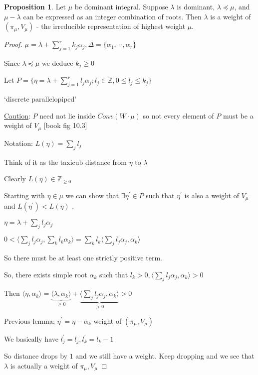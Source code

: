 \documentclass{article}
\theoremstyle{definition}
\newtheorem{proposition}{Proposition}
\begin{document}
\begin{proposition}
    Let \(\mu\) be dominant integral. Suppose \(\lambda\) is dominant, \(\lambda \preceq \mu\), and \(\mu - \lambda\)  can be expressed as an integer combination of roots. Then \(\lambda\) is a weight of \((\pi_\mu, V_\mu)\) - the irreducible representation of highest weight \(\mu\).     
\end{proposition}

\begin{proof}
    \(\mu = \lambda + \sum_{j=1}^r k_j \alpha_j, \Delta = \{ \alpha_1,\cdots, \alpha_r \} \)
    
    Since \(\lambda \preceq \mu\) we deduce \(k_j\geq 0\) 
    
    Let \(P = \{ \eta = \lambda + \sum_{j = 1} ^ r l_j \alpha_j ; l_j\in \mathbb{Z} , 0 \leq l_j \leq k_j  \} \) 
    
    `discrete parallelopiped'

    \underline{Caution}: \(P\) need not lie inside \(Conv(W\cdot\mu)\) so not every element of \(P\) must be a weight of \(V_\mu\) [book fig 10.3]
    
    Notation: \(L(\eta)= \sum_{j} l_j\) 

    Think of it as the taxicub distance from \(\eta\) to \(\lambda\)
    
    Clearly \(L(\eta)\in\mathbb{Z}_{\geq 0}\) 

    Starting with \(\eta \in \mu\) we can show that \(\exists \eta ^{\prime} \in P\) such that \(\eta ^{\prime} \) is also a weight of \(V_\mu\) and \(L(\eta ^{\prime} ) < L(\eta)\) .

    \(\eta = \lambda + \sum_{j} l_j \alpha_j\)
    
    \(0 < \langle \sum_{j} l_j \alpha_j, \sum_{k} l_k \alpha_k \rangle = \sum_{k} l_k \langle \sum_{j} l_j \alpha_j, \alpha_k \rangle \) 

    So there must be at least one strictly positive term.

    So, there exists simple root \(\alpha_k\) such that \(l_k > 0, \langle \sum_{j} l_j \alpha_j, \alpha_k \rangle > 0\)
    
    Then \(\langle \eta , \alpha_k \rangle = \underbrace{\langle \lambda, \alpha_k \rangle}_{\geq 0} + \underbrace{\langle \sum_{j} l_j \alpha_j, \alpha_k \rangle }_{>0} > 0 \) 

    Previous lemma; \(\eta ^{\prime} = \eta - \alpha_k\)-weight of \((\pi_\mu,V_\mu)\)  

    We basically have \(l_j^{\prime} = l_j, l_k^{\prime} = l_k - 1\) 

    So distance drops by \(1\) and we still have a weight. Keep dropping and we see that \(\lambda\) is actually a weight of \(\pi_\mu , V_\mu\)  

\end{proof}
\end{document}
